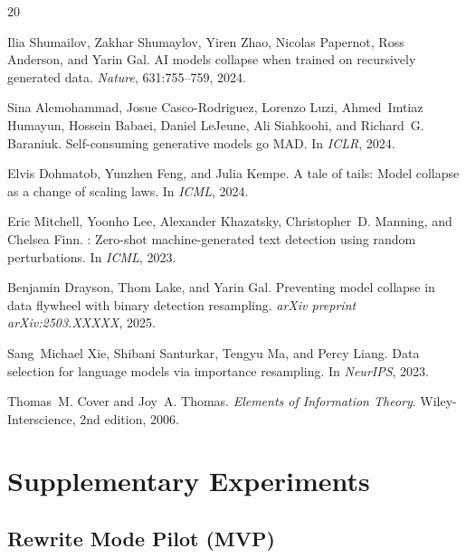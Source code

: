 \documentclass[11pt]{article}
\begin{document}
\begin{thebibliography}{20}

Ilia Shumailov, Zakhar Shumaylov, Yiren Zhao, Nicolas Papernot, Ross Anderson, and Yarin Gal.
\newblock AI models collapse when trained on recursively generated data.
\newblock \emph{Nature}, 631:755--759, 2024.

Sina Alemohammad, Josue Casco-Rodriguez, Lorenzo Luzi, Ahmed~Imtiaz Humayun, Hossein Babaei, Daniel LeJeune, Ali Siahkoohi, and Richard~G. Baraniuk.
\newblock Self-consuming generative models go {MAD}.
\newblock In \emph{ICLR}, 2024.

Elvis Dohmatob, Yunzhen Feng, and Julia Kempe.
\newblock A tale of tails: Model collapse as a change of scaling laws.
\newblock In \emph{ICML}, 2024.

Eric Mitchell, Yoonho Lee, Alexander Khazatsky, Christopher~D. Manning, and Chelsea Finn.
: Zero-shot machine-generated text detection using random perturbations.
\newblock In \emph{ICML}, 2023.

Benjamin Drayson, Thom Lake, and Yarin Gal.
\newblock Preventing model collapse in data flywheel with binary detection resampling.
\newblock \emph{arXiv preprint arXiv:2503.XXXXX}, 2025.

Sang~Michael Xie, Shibani Santurkar, Tengyu Ma, and Percy Liang.
\newblock Data selection for language models via importance resampling.
\newblock In \emph{NeurIPS}, 2023.

Thomas~M. Cover and Joy~A. Thomas.
\newblock \emph{Elements of Information Theory}.
\newblock Wiley-Interscience, 2nd edition, 2006.

\end{thebibliography}


\clearpage
\appendix
\section{Supplementary Experiments}

\subsection{Rewrite Mode Pilot (MVP)}
\label{app:mvp}
\end{document}
